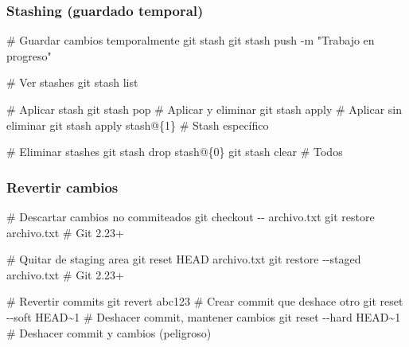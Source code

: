 \documentclass[
  11pt,
  letterpaper,
  oneside,
  openany]{scrbook}
\newenvironment{Shaded}{}{}
\newcommand{\AttributeTok}[1]{\textcolor[rgb]{0.84,0.23,0.29}{#1}}
\newcommand{\CommentTok}[1]{\textcolor[rgb]{0.42,0.45,0.49}{#1}}
\newcommand{\FunctionTok}[1]{\textcolor[rgb]{0.44,0.26,0.76}{#1}}
\newcommand{\NormalTok}[1]{\textcolor[rgb]{0.14,0.16,0.18}{#1}}
\newcommand{\StringTok}[1]{\textcolor[rgb]{0.01,0.18,0.38}{#1}}
\begin{document}
\subsubsection{Stashing (guardado
temporal)}\label{stashing-guardado-temporal}

\begin{Shaded}
\begin{Highlighting}[]
\CommentTok{\# Guardar cambios temporalmente}
\FunctionTok{git}\NormalTok{ stash}
\FunctionTok{git}\NormalTok{ stash push }\AttributeTok{{-}m} \StringTok{"Trabajo en progreso"}

\CommentTok{\# Ver stashes}
\FunctionTok{git}\NormalTok{ stash list}

\CommentTok{\# Aplicar stash}
\FunctionTok{git}\NormalTok{ stash pop  }\CommentTok{\# Aplicar y eliminar}
\FunctionTok{git}\NormalTok{ stash apply  }\CommentTok{\# Aplicar sin eliminar}
\FunctionTok{git}\NormalTok{ stash apply stash@\{1\}  }\CommentTok{\# Stash específico}

\CommentTok{\# Eliminar stashes}
\FunctionTok{git}\NormalTok{ stash drop stash@\{0\}}
\FunctionTok{git}\NormalTok{ stash clear  }\CommentTok{\# Todos}
\end{Highlighting}
\end{Shaded}

\subsubsection{Revertir cambios}\label{revertir-cambios}

\begin{Shaded}
\begin{Highlighting}[]
\CommentTok{\# Descartar cambios no commiteados}
\FunctionTok{git}\NormalTok{ checkout }\AttributeTok{{-}{-}}\NormalTok{ archivo.txt}
\FunctionTok{git}\NormalTok{ restore archivo.txt  }\CommentTok{\# Git 2.23+}

\CommentTok{\# Quitar de staging area}
\FunctionTok{git}\NormalTok{ reset HEAD archivo.txt}
\FunctionTok{git}\NormalTok{ restore }\AttributeTok{{-}{-}staged}\NormalTok{ archivo.txt  }\CommentTok{\# Git 2.23+}

\CommentTok{\# Revertir commits}
\FunctionTok{git}\NormalTok{ revert abc123  }\CommentTok{\# Crear commit que deshace otro}
\FunctionTok{git}\NormalTok{ reset }\AttributeTok{{-}{-}soft}\NormalTok{ HEAD\textasciitilde{}1  }\CommentTok{\# Deshacer commit, mantener cambios}
\FunctionTok{git}\NormalTok{ reset }\AttributeTok{{-}{-}hard}\NormalTok{ HEAD\textasciitilde{}1  }\CommentTok{\# Deshacer commit y cambios (peligroso)}
\end{Highlighting}
\end{Shaded}
\end{document}
